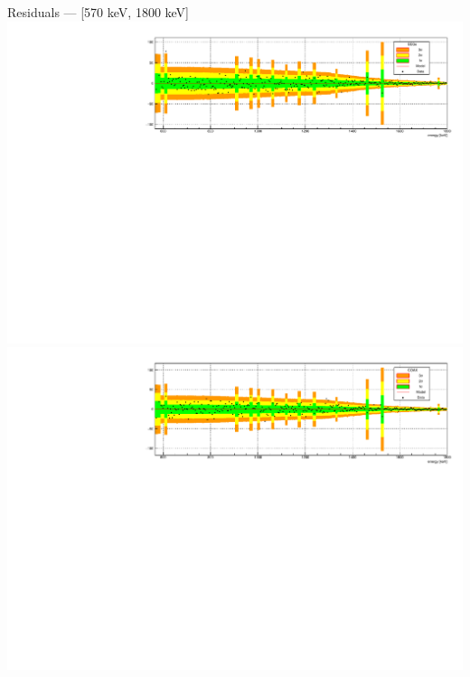 \documentclass[10pt]{beamer}
\begin{document}
\begin{frame}{Residuals --- [570 keV, 1800 keV]}
	\centering\includegraphics[height=\textwidth, angle=270]{img/resBEGe.pdf} \\
	\centering\includegraphics[height=\textwidth, angle=270]{img/resCOAX.pdf}
\end{frame}
\end{document}
